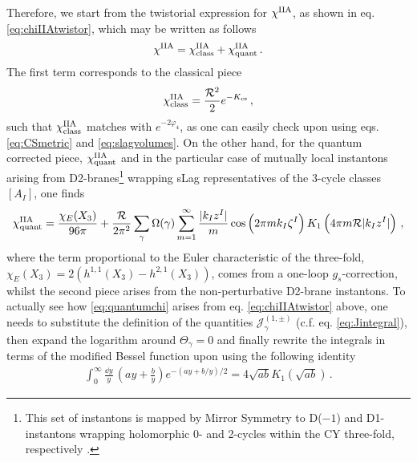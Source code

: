 Therefore, we start from the twistorial expression for $\chi^{\rm IIA}$, as shown in eq. \eqref{eq:chiIIAtwistor}, which may be written as follows \cite{Alexandrov:2008gh}
%
\begin{equation}\label{eq:fullcontactpotential}
	\chi^{\rm IIA}= \chi^{\rm IIA}_{\rm class} + \chi^{\rm IIA}_{\rm quant}\, .
\end{equation}
%
The first term corresponds to the classical piece
%
\begin{equation}\label{eq:classicalcontactpot}
	\chi^{\rm IIA}_{\rm class} = \frac{\mathcal{R}^2}{2} e^{-K_{\text{cs}}}\, ,
\end{equation}
%
such that $\chi^{\rm IIA}_{\rm class}$ matches with $e^{-2\varphi_4}$, as one can easily check upon using eqs. \eqref{eq:CSmetric} and \eqref{eq:slagvolumes}. On the other hand, for the quantum corrected piece, $\chi^{\rm IIA}_{\rm quant}$ and in the particular case of mutually local instantons arising from D2-branes\footnote{This set of instantons is mapped by Mirror Symmetry to D($-1$) and D1-instantons wrapping holomorphic 0- and 2-cycles within the CY three-fold, respectively \cite{Robles-Llana:2007bbv}.} wrapping sLag representatives of the 3-cycle classes $[A_I]$, one finds \cite{Robles-Llana:2007bbv,Alexandrov:2014sya,Cortes:2021vdm}
%
\begin{equation}\label{eq:quantumchi}
	\chi^{\rm IIA}_{\rm quant} = \frac{\chi_{E}(X_3)}{96\pi} + \frac{\mathcal{R}}{2\pi^2} \sum_{\gamma} \Omega (\gamma) \sum_{m=1}^{\infty} \frac{|k_I z^I|}{m} \cos \left( 2\pi m k_I \zeta^I\right) K_1 \left( 4\pi m \mathcal{R}|k_I z^I|\right)\, ,
\end{equation}
%
where the term proportional to the Euler characteristic of the three-fold, $\chi_{E}(X_3)=2( h^{1,1}(X_3)-h^{2,1}(X_3))$, comes from a one-loop $g_s$-correction, whilst the second piece arises from the non-perturbative D2-brane instantons. To actually see how \eqref{eq:quantumchi} arises from eq. \eqref{eq:chiIIAtwistor} above, one needs to substitute the definition of the quantities $\mathcal{J}_{\gamma}^{(1, \pm)}$ (c.f. eq. \eqref{eq:Jintegral}), then expand the logarithm around $\Theta_{\gamma}=0$ and finally rewrite the integrals in terms of the modified Bessel function upon using the following identity
%
\begin{align}\label{eq:Besselintegral}
	\int_{0}^{\infty} \frac{\dd y}{y}\, \left(ay + \frac{b}{y}\right) e^{-\left(ay+b/y\right)/2} = 4 \sqrt{ab} K_1 \left( \sqrt{ab}\right)\, .
\end{align}
%
	
